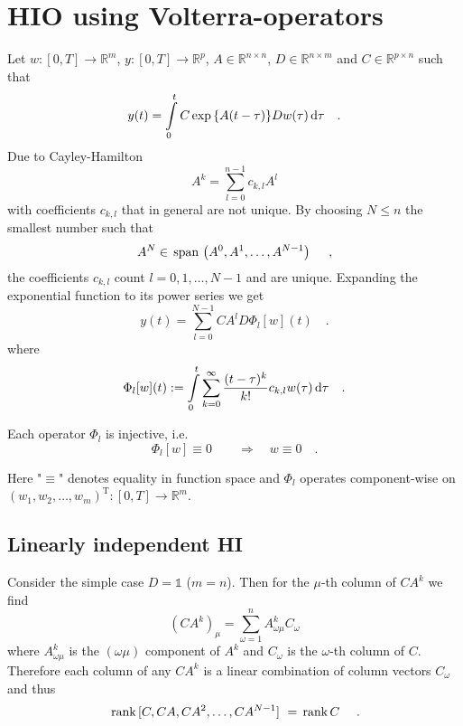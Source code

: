 \section{HIO using Volterra-operators}
Let $w:[0,T]\rightarrow \mathbb{R}^m$, $y:[0,T]\rightarrow \mathbb{R}^p$, 
$A\in \mathbb{R}^{n\times n}$, $D\in\mathbb{R}^{n\times m}$ and $C\in\mathbb{R}^{p\times 
n}
$ such that 
\begin{equation}
y(t) = \int\limits_0^t C \exp{\left\{A(t-\tau)\right\}} D w(\tau) \, \text{d} \tau \quad .
\label{eq:volterra:y}
\end{equation}
Due to Cayley-Hamilton
\begin{equation}
A^k = \sum\limits_{l=0}^{n-1} c_{k,l} A^l 
\end{equation}
with coefficients $c_{k,l}$ that in general are not unique. By choosing $N\leq n$ the 
smallest number such that
\begin{equation}
A^N \in  \, \text{span}\,\left(A^0,A^1,\ldots,A^{N-1} \right) \,\, \quad ,
\end{equation}
the coefficients $c_{k,l}$ count $l=0,1,\ldots,N-1$ and are unique. 
Expanding the exponential function to its power series we get
\begin{equation}
y(t) = \sum\limits_{l=0}^{N-1} CA^lD \Phi_l[w](t)
\quad . \label{eq:volterra_alt1:y_volterra}
\end{equation}
where
\begin{equation}
\Phi_l[w](t) :=  \int\limits_0^t \sum\limits_{k=0}^\infty \frac{(t-\tau)^k}{k!} c_{k,l} 
w(\tau) \, \text{d}\tau \quad .
\label{eq:volterra_alt1:Phi_l}
\end{equation}
\begin{proposition} \label{prop:volterra_alt1:1}
Each operator $\Phi_l$ is injective, i.e. 
\begin{equation}
\Phi_l[w] \equiv 0\quad \quad \Rightarrow  \quad w \equiv 0  \quad .
\end{equation}
\end{proposition}
Here "$\equiv$" denotes equality in function space and $\Phi_l$ operates component-wise 
on $(w_1,w_2,\ldots,w_m)^\text{T}:[0,T]\rightarrow \mathbb{R}^m$.
\clearpage

\subsection{Linearly independent HI}
Consider the simple case $D=\mathbb{1}$ ($m=n$). Then for the $\mu$-th column of $CA^k$ 
we find
\begin{equation}
\left(CA^k \right)_\mu = \sum\limits_{\omega = 1}^n A^k_{\omega\mu} C_\omega
\end{equation}
where $A^k_{\omega\mu}$ is the $(\omega\mu)$ component of $A^k$ and $C_\omega$ is the 
$\omega$-th column of $C$.
Therefore each column of any $CA^k$ is a linear combination of column vectors 
$C_\omega$ and thus 
\begin{equation}
 \, \text{rank}\,[C,CA,CA^2,\ldots,CA^{N-1}] \,\,  =  \, \text{rank}\,C \,\,  \quad .
\end{equation}

